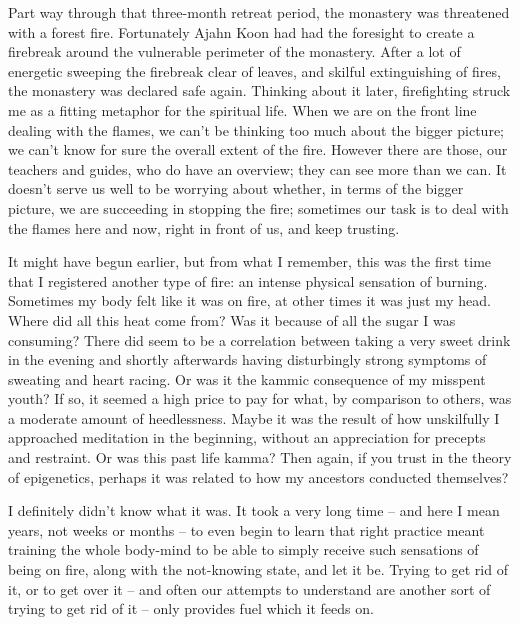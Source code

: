 Part way through that three-month retreat period, the monastery was
threatened with a forest fire. Fortunately Ajahn Koon had had the
foresight to create a firebreak around the vulnerable perimeter of the
monastery. After a lot of energetic sweeping the firebreak clear of
leaves, and skilful extinguishing of fires, the monastery was declared
safe again. Thinking about it later, firefighting struck me as a fitting
metaphor for the spiritual life. When we are on the front line dealing
with the flames, we can't be thinking too much about the bigger picture;
we can't know for sure the overall extent of the fire. However there are
those, our teachers and guides, who do have an overview; they can see
more than we can. It doesn't serve us well to be worrying about whether,
in terms of the bigger picture, we are succeeding in stopping the fire;
sometimes our task is to deal with the flames here and now, right in
front of us, and keep trusting.

It might have begun earlier, but from what I remember, this was the
first time that I registered another type of fire: an intense physical
sensation of burning. Sometimes my body felt like it was on fire,
at other times it was just my head. Where did all this heat come from?
Was it because of all the sugar I was consuming? There did seem to be a
correlation between taking a very sweet drink in the evening and shortly
afterwards having disturbingly strong symptoms of sweating and heart
racing. Or was it the kammic consequence of my misspent youth? If so, it
seemed a high price to pay for what, by comparison to others, was a
moderate amount of heedlessness. Maybe it was the result of how
unskilfully I approached meditation in the beginning, without an
appreciation for precepts and restraint. Or was this past life kamma?
Then again, if you trust in the theory of epigenetics\cite{epigenetics},
perhaps it was related to how my ancestors conducted themselves?

I definitely didn't know what it was. It took a very long time -- and
here I mean years, not weeks or months -- to even begin to learn that
right practice meant training the whole body-mind to be able to simply
receive such sensations of being on fire, along with the not-knowing
state, and let it be. Trying to get rid of it, or to get over it -- and
often our attempts to understand are another sort of trying to get rid
of it -- only provides fuel which it feeds on.

